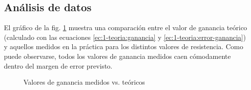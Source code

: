 \subsection{Análisis de datos}

El gráfico de la fig. \ref{fig:1-analisis:ganancia} muestra una comparación
entre el valor de ganancia teórico (calculado con las ecuaciones 
\ref{ec:1-teoria:ganancia} y \ref{ec:1-teoria:error-ganancia}) y aquellos 
medidos en la práctica para los distintos valores de resistencia. Como puede
observarse, todos los valores de ganancia medidos caen cómodamente dentro
del margen de error previsto.

\begin{figure}[H]
    \centering
    
    \caption{Valores de ganancia medidos vs. teóricos}
    \label{fig:1-analisis:ganancia}
\end{figure}
